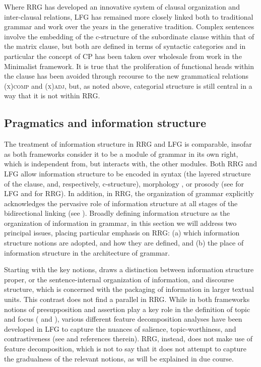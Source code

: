\documentclass[output=paper,hidelinks]{langscibook}
\begin{document}
Where RRG has developed an innovative system of clausal organization and inter-clausal relations, LFG has remained more closely linked both to traditional grammar and work over the years in the generative tradition. Complex sentences involve the embedding of the c-structure of the subordinate clause within that of the matrix clause, but both are defined in terms of syntactic categories and in particular the concept of CP has been taken over wholesale from work in the Minimalist framework. It is true that the proliferation of functional heads within the clause has been avoided through recourse to the new grammatical relations \textsc{(x)comp} and \textsc{(x)adj,} but, as noted above, categorial structure is still central in a way that it is not within RRG.

\subsection{Pragmatics and information structure}
\label{sec:RRG:3.6}

The treatment of information structure in RRG and LFG is comparable, insofar as both frameworks consider it to be a module of grammar in its own right, which is independent from, but interacts with, the other modules. Both RRG and LFG allow information structure to be encoded in syntax (the layered structure of the clause, and, respectively, c-structure), morphology \citep{Shimojo1995}, or prosody (see \citealt{Connor2006} for LFG and \citealt{OConnor2008} for RRG). In addition, in RRG, the organization of grammar explicitly acknowledges the pervasive role of information structure at all stages of the bidirectional linking (see ). Broadly defining information structure as the organization of information in grammar, in this section we will address two principal issues, placing particular emphasis on RRG: (a) which information structure notions are adopted, and how they are defined, and (b) the place of information structure in the architecture of grammar.

  Starting with the key notions,  draws a distinction between information structure proper, or the sentence-internal organization of information, and discourse structure, which is concerned with the packaging of information in larger textual units. This contrast does not find a parallel in RRG. While in both frameworks  notions of presupposition and assertion play a key role in the definition of topic and focus (\citealt[68-73]{VanValin2005} and ), various different feature decomposition analyses have been developed in LFG to capture the nuances of salience, topic-worthiness, and contrastiveness (see  and references therein). RRG, instead, does not make use of feature decomposition, which is not to say that it does not attempt to capture the gradualness of the relevant notions, as will be explained in due course.
\end{document}
